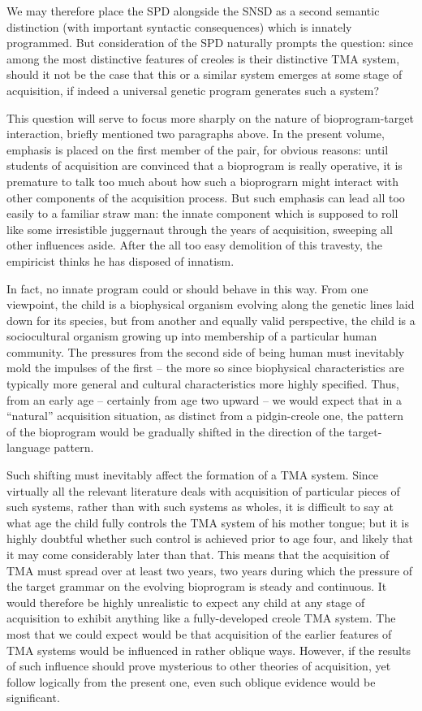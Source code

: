 We may therefore place the SPD alongside the SNSD as a second semantic distinction (with important syntactic consequences) which is innately programmed. But consideration of the SPD naturally prompts the question: since among the most distinctive features of creoles is their distinctive TMA system, should it not be the case that this or a similar system emerges at some stage of acquisition, if indeed a uni\-versal genetic program generates such a system?

This question will serve to focus more sharply on the nature of bioprogram-target interaction, briefly mentioned two paragraphs above. In the present volume, emphasis is placed on the first member of the pair, for obvious reasons: until students of acquisition are convinced that a bioprogram is really operative, it is premature to talk too much about how such a bioprograrn might interact with other components of the acquisition process. But such emphasis can lead all too easily to a familiar straw man: the innate component which is supposed to roll like some irresistible juggernaut through the years of acquisition, sweeping all other influences aside. After the all too easy demolition of this travesty, the empiricist thinks he has disposed of innatism.

In fact, no innate program could or should behave in this way. From one viewpoint, the child is a biophysical organism evolving along the genetic lines laid down for its species, but from another and equally valid perspective, the child is a sociocultural organism growing up into membership of a particular human community. The pressures from the second side of being human must inevitably mold the impulses of the first -- the more so since biophysical characteristics are typically more general and cultural characteristics more highly specified. Thus, from an early age -- certainly from age two upward -- we would expect that in a ``natural'' acquisition situation, as distinct from a pidgin-creole one, the pattern of the bioprogram would be gradually shifted in the direction of the target-language pattern.

Such shifting must inevitably affect the formation of a TMA
system. Since virtually all the relevant literature deals with acquisition of particular pieces of such systems, rather than with such systems as wholes, it is difficult to say at what age the child fully controls the TMA system of his mother tongue; but it is highly doubtful whether such control is achieved prior to age four, and likely that it may come considerably later than that. This means that the acquisition of TMA must spread over at least two years, two years during which the pressure of the target grammar on the evolving bioprogram is steady and continuous. It would therefore be highly unrealistic to expect any child at any stage of acquisition to exhibit anything like a fully-developed creole TMA system. The most that we could expect would be that acquisition of the earlier features of TMA systems would be influ\-enced in rather oblique ways. However, if the results of such influence should prove mysterious to other theories of acquisition, yet follow logically from the present one, even such oblique evidence would be significant.

